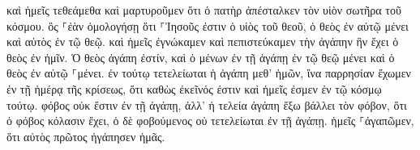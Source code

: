 \documentclass{openreader}
\begin{document}
καὶ ἡμεῖς τεθεάμεθα καὶ μαρτυροῦμεν ὅτι ὁ πατὴρ ἀπέσταλκεν τὸν υἱὸν σωτῆρα τοῦ κόσμου. ὃς ⸀ἐὰν ὁμολογήσῃ ὅτι ⸀Ἰησοῦς ἐστιν ὁ υἱὸς τοῦ θεοῦ, ὁ θεὸς ἐν αὐτῷ μένει καὶ αὐτὸς ἐν τῷ θεῷ. καὶ ἡμεῖς ἐγνώκαμεν καὶ πεπιστεύκαμεν τὴν ἀγάπην ἣν ἔχει ὁ θεὸς ἐν ἡμῖν. Ὁ θεὸς ἀγάπη ἐστίν, καὶ ὁ μένων ἐν τῇ ἀγάπῃ ἐν τῷ θεῷ μένει καὶ ὁ θεὸς ἐν αὐτῷ ⸀μένει. ἐν τούτῳ τετελείωται ἡ ἀγάπη μεθ’ ἡμῶν, ἵνα παρρησίαν ἔχωμεν ἐν τῇ ἡμέρᾳ τῆς κρίσεως, ὅτι καθὼς ἐκεῖνός ἐστιν καὶ ἡμεῖς ἐσμεν ἐν τῷ κόσμῳ τούτῳ. φόβος οὐκ ἔστιν ἐν τῇ ἀγάπῃ, ἀλλ’ ἡ τελεία ἀγάπη ἔξω βάλλει τὸν φόβον, ὅτι ὁ φόβος κόλασιν ἔχει, ὁ δὲ φοβούμενος οὐ τετελείωται ἐν τῇ ἀγάπῃ. ἡμεῖς ⸀ἀγαπῶμεν, ὅτι αὐτὸς πρῶτος ἠγάπησεν ἡμᾶς. 
\end{document}
